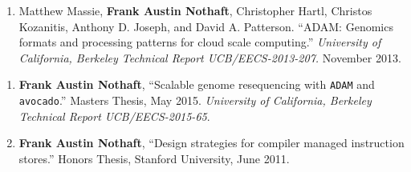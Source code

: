 \documentclass[10pt]{article} %
\newcounter{pubCtr}
\begin{document}
\begin {minipage}[t]{0.8\linewidth}

\begin{enumerate}
\setcounter{enumi}{\thepubCtr}
\item {Matthew Massie, \textbf{Frank Austin Nothaft}, Christopher Hartl, Christos Kozanitis,
Anthony D. Joseph, and David A. Patterson. ``ADAM: Genomics formats and processing patterns
for cloud scale computing.'' \emph{University of California, Berkeley Technical Report
UCB/EECS-2013-207.} November 2013.}
\setcounter{pubCtr}{\theenumi}
\end{enumerate}

%

\end{minipage}

\begin {minipage}[t]{0.2\linewidth}
\vspace{0pt}
\end {minipage}
\begin {minipage}[t]{0.8\linewidth}
\vspace{0pt}


\begin{enumerate}
\setcounter{enumi}{\thepubCtr}
\item {\textbf{Frank Austin Nothaft}, ``Scalable genome resequencing with \texttt{ADAM} and \texttt{avocado}.''
Masters Thesis, May 2015. \emph{University of California, Berkeley Technical Report UCB/EECS-2015-65}.} 
\item {\textbf{Frank Austin Nothaft}, ``Design strategies for compiler managed instruction stores.''
Honors Thesis, Stanford University, June 2011.}
\end{enumerate}

\noindent{}

\end {minipage}
\end{document}

